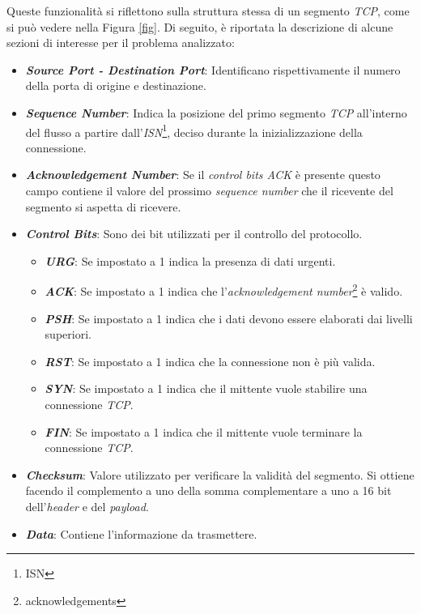 \noindent Queste funzionalità si riflettono sulla struttura stessa di un segmento \emph{TCP}, come si può vedere nella Figura \ref{fig}. 
Di seguito, è riportata la descrizione di alcune sezioni di interesse per il problema analizzato:

\begin{itemize}
\item \textit{\textbf{Source Port - Destination Port}}: Identificano rispettivamente il numero della porta di origine e destinazione.
\item \textit{\textbf{Sequence Number}}: Indica la posizione del primo segmento \emph{TCP} all'interno del flusso a partire dall'\emph{ISN}\footnote{\gls{ISN}}, deciso durante la inizializzazione della connessione.
\item \textit{\textbf{Acknowledgement Number}}: Se il \emph{control bits ACK} è presente questo campo contiene il valore del prossimo \emph{sequence number} che il ricevente del segmento si aspetta di ricevere.
\item \textit{\textbf{Control Bits}}: Sono dei bit utilizzati per il controllo del protocollo. 
\begin{itemize}
    \item \textit{\textbf{URG}}: Se impostato a 1 indica la presenza di dati urgenti.
    \item \textit{\textbf{ACK}}: Se impostato a 1 indica che l'\emph{acknowledgement number}\footnote{\gls{acknowledgements}} è valido.
    \item \textit{\textbf{PSH}}: Se impostato a 1 indica che i dati devono essere elaborati dai livelli superiori.
    \item \textit{\textbf{RST}}: Se impostato a 1 indica che la connessione non è più valida.
    \item \textit{\textbf{SYN}}: Se impostato a 1 indica che il mittente vuole stabilire una connessione \emph{TCP}.
    \item \textit{\textbf{FIN}}: Se impostato a 1 indica che il mittente vuole terminare la connessione \emph{TCP}.
\end{itemize}
\item \textit{\textbf{Checksum}}: Valore utilizzato per verificare la validità del segmento. Si ottiene facendo il complemento a uno della somma complementare a uno a 16 bit dell'\emph{header} e del \emph{payload}.
\item \textit{\textbf{Data}}: Contiene l'informazione da trasmettere.
\end{itemize}


